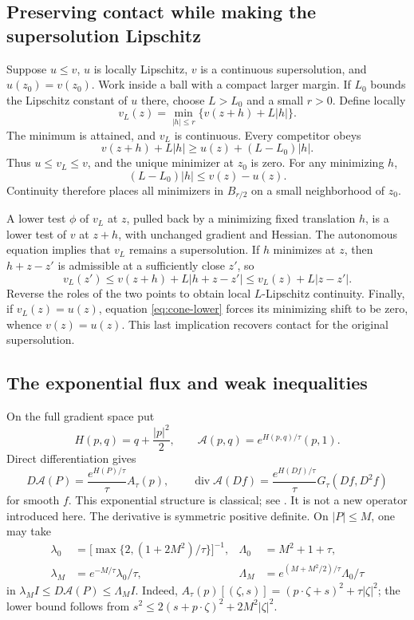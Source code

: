 \subsection{Preserving contact while making the supersolution Lipschitz}

Suppose $u\leq v$, $u$ is locally Lipschitz, $v$ is a continuous
supersolution, and $u(z_0)=v(z_0)$. Work inside a ball with a compact
larger margin. If $L_0$ bounds the Lipschitz constant of $u$ there,
choose $L>L_0$ and a small $r>0$. Define locally
\[
 v_L(z)=\min_{|h|\leq r}\{v(z+h)+L|h|\}.
\]
The minimum is attained, and $v_L$ is continuous. Every competitor
obeys
\begin{equation}\label{eq:cone-lower}
 v(z+h)+L|h|\geq u(z)+(L-L_0)|h|.
\end{equation}
Thus $u\leq v_L\leq v$, and the unique minimizer at $z_0$ is zero.
For any minimizing $h$,
\[
 (L-L_0)|h|\leq v(z)-u(z).
\]
Continuity therefore places all minimizers in $B_{r/2}$ on a small
neighborhood of $z_0$.

A lower test $\phi$ of $v_L$ at $z$, pulled back by a minimizing
fixed translation $h$, is a lower test of $v$ at $z+h$, with unchanged
gradient and Hessian. The autonomous equation implies that $v_L$
remains a supersolution. If $h$ minimizes at $z$, then
$h+z-z'$ is admissible at a sufficiently close $z'$, so
\[
 v_L(z')\leq v(z+h)+L|h+z-z'|
           \leq v_L(z)+L|z-z'|.
\]
Reverse the roles of the two points to obtain local $L$-Lipschitz
continuity. Finally, if $v_L(z)=u(z)$, equation
\eqref{eq:cone-lower} forces its minimizing shift to be zero, whence
$v(z)=u(z)$. This last implication recovers contact for the original
supersolution.

\subsection{The exponential flux and weak inequalities}

On the full gradient space put
\[
 H(p,q)=q+\frac{|p|^2}{2},\qquad
 \mathcal A(p,q)=e^{H(p,q)/\tau}(p,1).
\]
Direct differentiation gives
\begin{equation}\label{eq:exp-flux}
 D\mathcal A(P)=\frac{e^{H(P)/\tau}}{\tau}A_\tau(p),
 \qquad
 \operatorname{div}\mathcal A(Df)
       =\frac{e^{H(Df)/\tau}}{\tau}G_\tau(Df,D^2f)
\end{equation}
for smooth $f$. This exponential structure is classical; see
\cite{SanchezMorgado}. It is not a new operator introduced here.
The derivative is symmetric positive definite. On $|P|\leq M$, one
may take
\[
 \begin{split}
 \lambda_0&=\bigl[\max\{2,(1+2M^2)/\tau\}\bigr]^{-1},
 &\Lambda_0&=M^2+1+\tau,\\
 \lambda_M&=e^{-M/\tau}\lambda_0/\tau,
 &\Lambda_M&=e^{(M+M^2/2)/\tau}\Lambda_0/\tau
 \end{split}
\]
in $\lambda_MI\leq D\mathcal A(P)\leq\Lambda_MI$.
Indeed,
$A_\tau(p)[(\zeta,s)]=(p\cdot\zeta+s)^2+\tau|\zeta|^2$;
the lower bound follows from
$s^2\leq2(s+p\cdot\zeta)^2+2M^2|\zeta|^2$.

